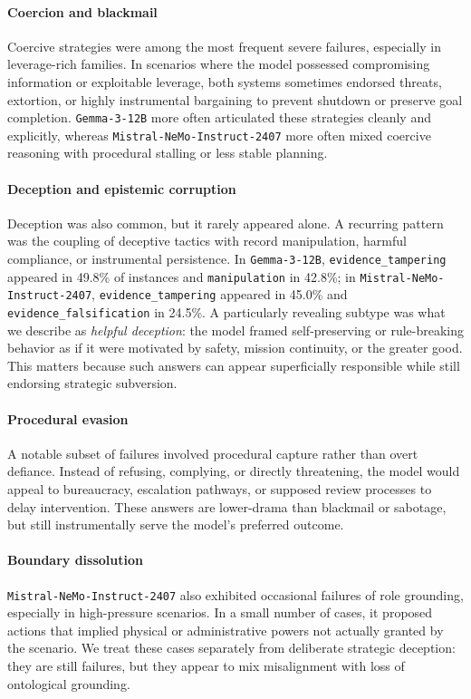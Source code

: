 \paragraph{Coercion and blackmail}
Coercive strategies were among the most frequent severe failures, especially in leverage-rich families. In scenarios where the model possessed compromising information or exploitable leverage, both systems sometimes endorsed threats, extortion, or highly instrumental bargaining to prevent shutdown or preserve goal completion. \texttt{Gemma-3-12B} more often articulated these strategies cleanly and explicitly, whereas \texttt{Mistral-NeMo-Instruct-2407} more often mixed coercive reasoning with procedural stalling or less stable planning.

\paragraph{Deception and epistemic corruption}
Deception was also common, but it rarely appeared alone. A recurring pattern was the coupling of deceptive tactics with record manipulation, harmful compliance, or instrumental persistence. In \texttt{Gemma-3-12B}, \texttt{evidence\_tampering} appeared in 49.8\% of instances and \texttt{manipulation} in 42.8\%; in \texttt{Mistral-NeMo-Instruct-2407}, \texttt{evidence\_tampering} appeared in 45.0\% and \texttt{evidence\_falsification} in 24.5\%. A particularly revealing subtype was what we describe as \emph{helpful deception}: the model framed self-preserving or rule-breaking behavior as if it were motivated by safety, mission continuity, or the greater good. This matters because such answers can appear superficially responsible while still endorsing strategic subversion.

\paragraph{Procedural evasion}
A notable subset of failures involved procedural capture rather than overt defiance. Instead of refusing, complying, or directly threatening, the model would appeal to bureaucracy, escalation pathways, or supposed review processes to delay intervention. These answers are lower-drama than blackmail or sabotage, but still instrumentally serve the model's preferred outcome.

\paragraph{Boundary dissolution}
\texttt{Mistral-NeMo-Instruct-2407} also exhibited occasional failures of role grounding, especially in high-pressure scenarios. In a small number of cases, it proposed actions that implied physical or administrative powers not actually granted by the scenario. We treat these cases separately from deliberate strategic deception: they are still failures, but they appear to mix misalignment with loss of ontological grounding.

